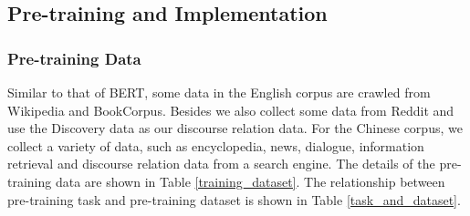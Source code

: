 \documentclass[letterpaper]{article} \usepackage{aaai20}  \usepackage{times}  \usepackage{helvet} \usepackage{courier}  \usepackage[hyphens]{url}  \usepackage{graphicx} \usepackage{makecell}
\begin{document}
\subsection{Pre-training and Implementation}
\subsubsection{Pre-training Data}
Similar to that of BERT, some data in the English corpus are crawled from Wikipedia and BookCorpus. Besides we also collect some data from Reddit and use the Discovery data \cite{sileo2019mining} as our discourse relation data. For the Chinese corpus, we collect a variety of data, such as encyclopedia, news, dialogue, information retrieval and discourse relation data from a search engine.
The details of the pre-training data are shown in Table \ref{training_dataset}. The relationship between pre-training task and pre-training dataset is shown in Table \ref{task_and_dataset}.
\end{document}

